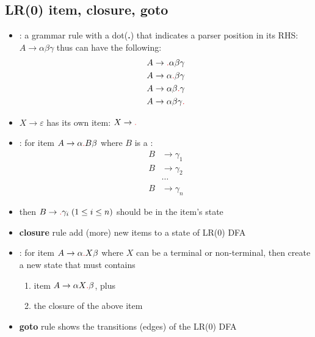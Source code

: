 \documentclass[10pt,a4paper,landscape]{article}
\begin{document}
\pagestyle{empty}

\begin{multicols*}{3}
\section*{LR(0) item, closure, goto}
\begin{itemize}
\item {}: a grammar rule with a dot(\textbf{.}) that indicates a
  parser position in its RHS: $A \to \alpha\beta\gamma$ thus can have the following:
  \begin{align*}
    A &\to \lrd\alpha\beta\gamma \\
    A &\to \alpha\lrd\beta\gamma \\
    A &\to \alpha\beta\lrd\gamma \\
    A &\to \alpha\beta\gamma\lrd
  \end{align*}
\item $X \to\varepsilon$ has its own item: $X\to\lrd$
\item {}: for item $A\to\alpha\lrd B\beta$ where $B$ is a :
  \begin{align*}
    B &\to \gamma_1 \\
    B &\to \gamma_2 \\
    &\cdots \\
    B &\to \gamma_n
  \end{align*}
\item[] then  $B\to\lrd\gamma_i\;(1 \leq i \leq n)$ should be in the item's state
\item \textbf{closure} rule add (more) new items to a state of LR(0) DFA
\item {}: for item $A\to\alpha\lrd X\beta$ where $X$ can be a terminal or non-terminal, then create a new state that must contains
  \begin{enumerate}
  \item item $A\to\alpha X\lrd\beta$, plus
  \item the closure of the above item
  \end{enumerate}
\item \textbf{goto} rule shows the transitions (edges) of the LR(0) DFA
\end{itemize}
\end{multicols*}
\end{document}
